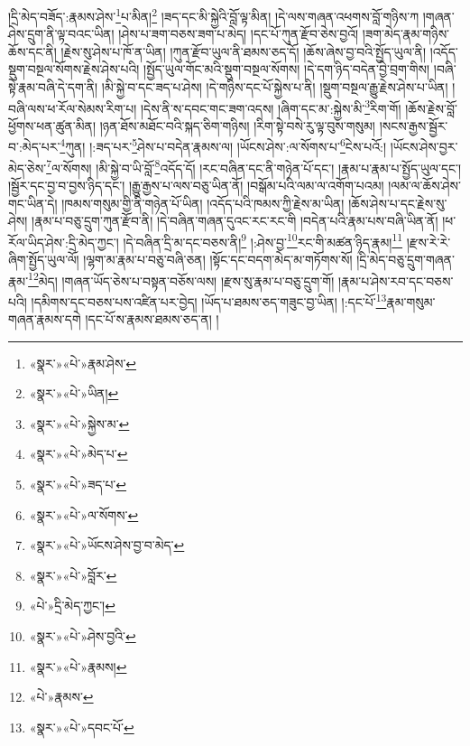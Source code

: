 །དྲི་མེད་བཟོད་:རྣམས་ཤེས་\footnote{«སྣར་»«པེ་»རྣམ་ཤེས་}པ་མིན།\footnote{«སྣར་»«པེ་»ཡིན།} །ཟད་དང་མི་སྐྱེའི་བློ་ལྟ་མིན། །དེ་ལས་གཞན་འཕགས་བློ་གཉིས་ཀ །གཞན་ཤེས་དྲུག་ནི་ལྟ་བའང་ཡིན། །ཤེས་པ་ཟག་བཅས་ཟག་པ་མེད། །དང་པོ་ཀུན་རྫོབ་ཅེས་བྱའོ། །ཟག་མེད་རྣམ་གཉིས་ཆོས་དང་ནི། །རྗེས་སུ་ཤེས་པ་ཁོ་ན་ཡིན། །ཀུན་རྫོབ་ཡུལ་ནི་ཐམས་ཅད་དོ། །ཆོས་ཞེས་བྱ་བའི་སྤྱོད་ཡུལ་ནི། །འདོད་སྡུག་བསྔལ་སོགས་རྗེས་ཤེས་པའི། །སྤྱོད་ཡུལ་གོང་མའི་སྡུག་བསྔལ་སོགས། །དེ་དག་ཉིད་བདེན་བྱེ་བྲག་གིས། །བཞི་སྟེ་རྣམ་བཞི་དེ་དག་ནི། །མི་སྐྱེ་བ་དང་ཟད་པ་ཤེས། །དེ་གཉིས་དང་པོ་སྐྱེས་པ་ནི། །སྡུག་བསྔལ་རྒྱུ་རྗེས་ཤེས་པ་ཡིན། །བཞི་ལས་ཕ་རོལ་སེམས་རིག་པ། །དེས་ནི་ས་དབང་གང་ཟག་འདས། །ཞིག་དང་མ་:སྐྱེས་མི་\footnote{«སྣར་»«པེ་»སྐྱེས་མ་}རིག་གོ། །ཆོས་རྗེས་བློ་ཕྱོགས་ཕན་ཚུན་མིན། །ཉན་ཐོས་མཐོང་བའི་སྐད་ཅིག་གཉིས། །རིག་སྟེ་བསེ་རུ་ལྟ་བུས་གསུམ། །སངས་རྒྱས་སྦྱོར་བ་:མེད་པར་\footnote{«སྣར་»«པེ་»མེད་པ་}ཀུན། །:ཟད་པར་\footnote{«སྣར་»«པེ་»ཟད་པ་}ཤེས་པ་བདེན་རྣམས་ལ། །ཡོངས་ཤེས་:ལ་སོགས་པ་\footnote{«སྣར་»«པེ་»ལ་སོགས་}ངེས་པའོ:། །ཡོངས་ཤེས་བྱར་མེད་ཅེས་\footnote{«སྣར་»«པེ་»ཡོངས་ཤེས་བྱ་བ་མེད་}ལ་སོགས། །མི་སྐྱེ་བ་ཡི་བློ་\footnote{«སྣར་»«པེ་»བློར་}འདོད་དོ། །རང་བཞིན་དང་ནི་གཉེན་པོ་དང་། །རྣམ་པ་རྣམ་པ་སྤྱོད་ཡུལ་དང་། །སྦྱོར་དང་བྱ་བ་བྱས་ཉིད་དང་། །རྒྱུ་རྒྱས་པ་ལས་བཅུ་ཡིན་ནོ། །བསྒོམ་པའི་ལམ་ལ་འགོག་པའམ། །ལམ་ལ་ཆོས་ཤེས་གང་ཡིན་དེ། །ཁམས་གསུམ་གྱི་ནི་གཉེན་པོ་ཡིན། །འདོད་པའི་ཁམས་ཀྱི་རྗེས་མ་ཡིན། །ཆོས་ཤེས་པ་དང་རྗེས་སུ་ཤེས། །རྣམ་པ་བཅུ་དྲུག་ཀུན་རྫོབ་ནི། །དེ་བཞིན་གཞན་དུའང་རང་རང་གི །བདེན་པའི་རྣམ་པས་བཞི་ཡིན་ནོ། །ཕ་རོལ་ཡིད་ཤེས་:དྲི་མེད་ཀྱང་། །དེ་བཞིན་དྲི་མ་དང་བཅས་ནི།\footnote{«པེ་»དྲི་མེད་ཀྱང་།} །:ཤེས་བྱ་\footnote{«སྣར་»«པེ་»ཤེས་བྱའི་}རང་གི་མཚན་ཉིད་རྣམ།\footnote{«སྣར་»«པེ་»རྣམས།} །རྫས་རེ་རེ་ཞིག་སྤྱོད་ཡུལ་ལོ། །ལྷག་མ་རྣམ་པ་བཅུ་བཞི་ཅན། །སྟོང་དང་བདག་མེད་མ་གཏོགས་སོ། །དྲི་མེད་བཅུ་དྲུག་གཞན་རྣམ་\footnote{«པེ་»རྣམས་}མེད། །གཞན་ཡོད་ཅེས་པ་བསྟན་བཅོས་ལས། །རྫས་སུ་རྣམ་པ་བཅུ་དྲུག་གོ། །རྣམ་པ་ཤེས་རབ་དང་བཅས་པའི། །དམིགས་དང་བཅས་པས་འཛིན་པར་བྱེད། །ཡོད་པ་ཐམས་ཅད་གཟུང་བྱ་ཡིན། །:དང་པོ་\footnote{«སྣར་»«པེ་»དབང་པོ་}རྣམ་གསུམ་གཞན་རྣམས་དགེ །དང་པོ་ས་རྣམས་ཐམས་ཅད་ན། །
